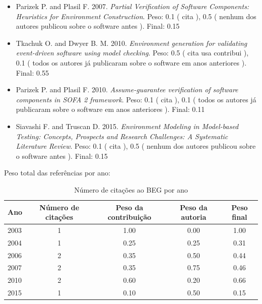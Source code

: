 \begin{itemize}
\item Parizek P. and Plasil F.
      2007.
        \textit{ Partial Verification of Software Components: Heuristics for Environment Construction}.
      Peso:
      0.1 (
          cita
      ),
      0.5 (
nenhum dos autores publicou sobre o software antes
      ).
      Final:
      0.15

\item Tkachuk O. and Dwyer B. M.
      2010.
        \textit{ Environment generation for validating event-driven software using model checking}.
      Peso:
      0.5 (
          cita
          usa
          contribui
      ),
      0.1 (
todos os autores já publicaram sobre o software em anos anteriores
      ).
      Final:
      0.55

\item Parizek P. and Plasil F.
      2010.
        \textit{ Assume-guarantee verification of software components in SOFA 2 framework}.
      Peso:
      0.1 (
          cita
      ),
      0.1 (
todos os autores já publicaram sobre o software em anos anteriores
      ).
      Final:
      0.11

\item Siavashi F. and Truscan D.
      2015.
        \textit{ Environment Modeling in Model-based Testing: Concepts, Prospects and Research Challenges: A Systematic Literature Review}.
      Peso:
      0.1 (
          cita
      ),
      0.5 (
nenhum dos autores publicou sobre o software antes
      ).
      Final:
      0.15

\end{itemize}

Peso total das referências por ano:

\begin{table}[h]
\caption{Número de citações ao BEG  por ano}
\centering
\begin{tabular}{| l | c | c | c | c |}
  \hline
  Ano & Número de citações & Peso da contribuição & Peso da autoria & Peso final \\
  \hline
  2003
    & 1
    & 1.00
    & 0.00
    & 1.00 \\
  2004
    & 1
    & 0.25
    & 0.25
    & 0.31 \\
  2006
    & 2
    & 0.35
    & 0.50
    & 0.44 \\
  2007
    & 2
    & 0.35
    & 0.75
    & 0.46 \\
  2010
    & 2
    & 0.60
    & 0.20
    & 0.66 \\
  2015
    & 1
    & 0.10
    & 0.50
    & 0.15 \\
  \hline
\end{tabular}
\end{table}


